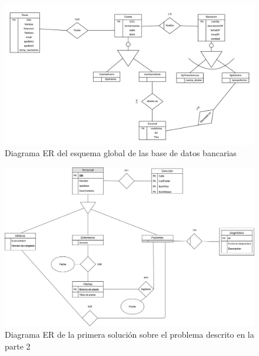 \documentclass{article}
\begin{document}
\begin{landscape}
\begin{figure}
\centering
\includegraphics[scale=0.75]{images/DiagramaGLOBAL.png}
\caption{Diagrama ER del esquema global de las base de datos bancarias}
\label{fig:er_global1}
\end{figure}
\end{landscape}


\begin{landscape}
\begin{figure}
\centering
\includegraphics[scale=0.5]{images/er_parte2_1.jpg}
\caption{Diagrama ER de la primera solución sobre el problema descrito en la parte 2}
\label{fig:er_parte2_1}
\end{figure}
\end{landscape}
\end{document}
